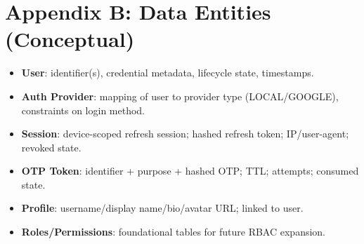 \documentclass[11pt]{article}
\begin{document}
    \section{Appendix B: Data Entities (Conceptual)}
    \begin{itemize}
        \item \textbf{User}: identifier(s), credential metadata, lifecycle state, timestamps.
        \item \textbf{Auth Provider}: mapping of user to provider type (LOCAL/GOOGLE), constraints on login method.
        \item \textbf{Session}: device-scoped refresh session; hashed refresh token; IP/user-agent; revoked state.
        \item \textbf{OTP Token}: identifier + purpose + hashed OTP; TTL; attempts; consumed state.
        \item \textbf{Profile}: username/display name/bio/avatar URL; linked to user.
        \item \textbf{Roles/Permissions}: foundational tables for future RBAC expansion.
    \end{itemize}
\end{document}
